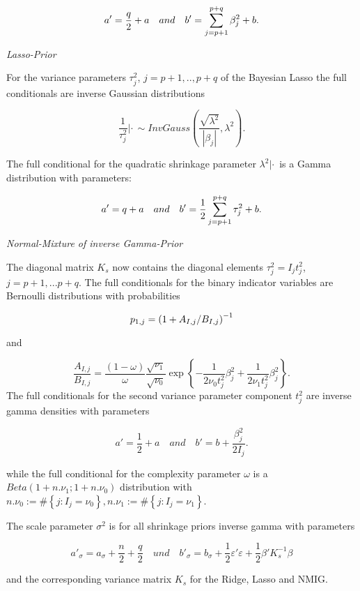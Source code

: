 \documentclass[11pt,a4paper,twoside]{bayesxarticle}
\begin{document}
\[a'=\frac{q}{2} +a\quad {\rm and}\quad b'=\sum _{j=p+1}^{p+q}\beta _{j}^{2}  +b.\] 


{\em Lasso-Prior}

For the variance parameters $\tau _{j}^{2} $, $j=p+1,..,p+q$ of the Bayesian Lasso the 
full conditionals are inverse Gaussian distributions

\[\frac{1}{\tau _{j}^{2} } |\cdot \, \sim InvGauss\left(\frac{\sqrt{\lambda ^{2} 
} }{\left|\beta _{j} \right|} ,\lambda ^{2} \right).\] 

The full conditional for the quadratic shrinkage parameter $\lambda ^{2} |\cdot \, $ is 
a Gamma distribution with parameters:

\[a'=q+a\quad {\rm and}\quad b'=\frac{1}{2} \sum _{j=p+1}^{p+q}\tau _{j}^{2}  +b.\] 

{\em Normal-Mixture of inverse Gamma-Prior}

The diagonal matrix $K_{s} $ now contains the diagonal elements $\tau _{j}^{2} 
=I_{j} t_{j}^{2} $, $j=p+1,...p+q$. The full conditionals for the binary indicator 
variables are Bernoulli distributions with probabilities

\[p_{1,j} =\left({1+A_{I,j} \mathord{\left/ {\vphantom {1+A_{I,j}  B_{I,j} }} \right. 
\kern-\nulldelimiterspace} B_{I,j} } \right)^{-1} \] 

and 

\[\frac{A_{I,j} }{B_{I,j} } =\frac{\left(1-\omega \right)}{\omega } \frac{\sqrt{
\nu _{1} } }{\sqrt{\nu _{0} } } \exp \left\{-\frac{1}{2\nu _{0} t_{j}^{2} } \beta 
_{j}^{2} +\frac{1}{2\nu _{1} t_{j}^{2} } \beta _{j}^{2} \right\}.\] 
The full conditionals for the second variance parameter component $t_{j}^{2} $ are 
inverse gamma densities with parameters 

\[a'=\frac{1}{2} +a\quad and\quad b'=b+\frac{\beta _{j}^{2} }{2I_{j} } .\] 

while the full conditional for the complexity parameter $\omega $ is a $Beta\left(1+n.
\nu _{1} ;1+n.\nu _{0} \right)$ distribution with $n.\nu _{0} :=\# \left\{j:I_{j} 
=\nu _{0} \right\},n.\nu _{1} :=\# \left\{j:I_{j} =\nu _{1} \right\}$.

The scale parameter $\sigma ^{2} $ is for all shrinkage priors inverse 
gamma with parameters

\[a'_{\sigma } =a_{\sigma } +\frac{n}{2} +\frac{q}{2} \quad und\quad b'_{\sigma } 
=b_{\sigma } +\frac{1}{2} \varepsilon '\varepsilon +\frac{1}{2} \beta 'K_{s}^{-1} 
\beta \] 

and the corresponding variance matrix $K_{s} $ for the Ridge, Lasso and NMIG.
\end{document}
